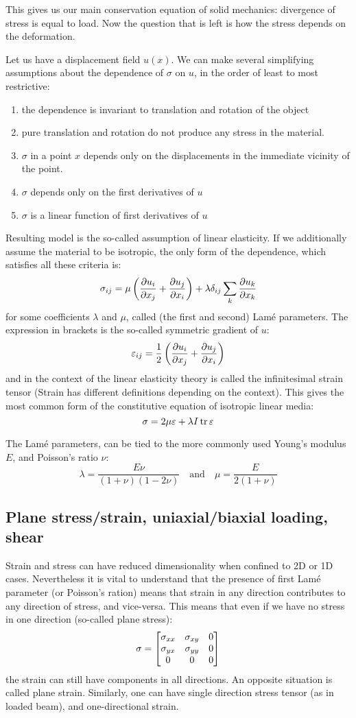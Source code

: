 \documentclass[12pt]{article}
\begin{document}
This gives us our main conservation equation of solid mechanics: divergence of stress is equal to load. Now the question that is left is how the stress depends on the deformation.

Let us have a displacement field $u(x)$. We can make several simplifying assumptions about the dependence of $\sigma$ on $u$, in the order of least to most restrictive:
\begin{enumerate}
    \item the dependence is invariant to translation and rotation of the object
    \item pure translation and rotation do not produce any stress in the material.
    \item $\sigma$ in a point $x$ depends only on the displacements in the immediate vicinity of the point.
    \item $\sigma$ depends only on the first derivatives of $u$
    \item $\sigma$ is a linear function of first derivatives of $u$
\end{enumerate}
Resulting model is the so-called assumption of linear elasticity. If we additionally assume the material to be isotropic, the only form of the dependence, which satisfies all these criteria is:
\[\sigma_{ij} = \mu\left(\frac{\partial u_i}{\partial x_j}+\frac{\partial u_j}{\partial x_i}\right) + \lambda\delta_{ij}\sum_k\frac{\partial u_k}{\partial x_k}\]
for some coefficients $\lambda$ and $\mu$, called (the first and second) Lam\'e parameters. The expression in brackets is the so-called symmetric gradient of $u$:
\[\varepsilon_{ij} = \frac{1}{2}\left(\frac{\partial u_i}{\partial x_j}+\frac{\partial u_j}{\partial x_i}\right)\]
and in the context of the linear elasticity theory is called the infinitesimal strain tensor (Strain has different definitions depending on the context). This gives the most common form of the constitutive equation of isotropic linear media:
\[\sigma = 2\mu\varepsilon + \lambda I \operatorname{tr}{\varepsilon}\]

The Lam\'e parameters, can be tied to the more commonly used Young's modulus $E$, and Poisson's ratio $\nu$:
\[\lambda = \frac{E\nu}{(1+\nu)(1-2\nu)}\quad\text{and}\quad\mu=\frac{E}{2(1+\nu)}\]

\subsection{Plane stress/strain, uniaxial/biaxial loading, shear}

Strain and stress can have reduced dimensionality when confined to 2D or 1D cases. Nevertheless it is vital to understand that the presence of first Lam\'e parameter (or Poisson's ration) means that strain in any direction contributes to any direction of stress, and vice-versa. This means that even if we have no stress in one direction (so-called plane stress):
\[\sigma=\left[\begin{matrix}
\sigma_{xx}&\sigma_{xy}&0\\
\sigma_{yx}&\sigma_{yy}&0\\
0&0&0\end{matrix}\right]\]
the strain can still have components in all directions. An opposite situation is called plane strain. Similarly, one can have single direction stress tensor (as in loaded beam), and one-directional strain.
\end{document}

